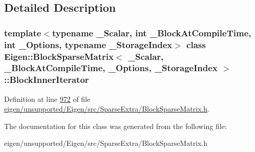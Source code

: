 \subsection{Detailed Description}
\subsubsection*{template$<$typename \+\_\+\+Scalar, int \+\_\+\+Block\+At\+Compile\+Time, int \+\_\+\+Options, typename \+\_\+\+Storage\+Index$>$\newline
class Eigen\+::\+Block\+Sparse\+Matrix$<$ \+\_\+\+Scalar, \+\_\+\+Block\+At\+Compile\+Time, \+\_\+\+Options, \+\_\+\+Storage\+Index $>$\+::\+Block\+Inner\+Iterator}



Definition at line \hyperlink{eigen_2unsupported_2_eigen_2src_2_sparse_extra_2_block_sparse_matrix_8h_source_l00972}{972} of file \hyperlink{eigen_2unsupported_2_eigen_2src_2_sparse_extra_2_block_sparse_matrix_8h_source}{eigen/unsupported/\+Eigen/src/\+Sparse\+Extra/\+Block\+Sparse\+Matrix.\+h}.



The documentation for this class was generated from the following file\+:\begin{DoxyCompactItemize}
\item 
eigen/unsupported/\+Eigen/src/\+Sparse\+Extra/\+Block\+Sparse\+Matrix.\+h\end{DoxyCompactItemize}
